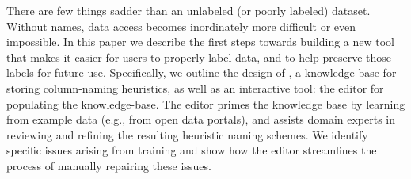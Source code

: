There are few things sadder than an unlabeled (or poorly labeled) dataset.
Without names, data access becomes inordinately more difficult or even impossible.
In this paper we describe the first steps towards building a new tool that makes it easier for users to properly label data, and to help preserve those labels for future use.
Specifically, we outline the design of \systemname, a knowledge-base for storing column-naming heuristics, as well as an interactive tool: the \systemname editor for populating the knowledge-base.  
The \systemname editor primes the knowledge base by learning from example data (e.g., from open data portals), and assists domain experts in reviewing and refining the resulting heuristic naming schemes.
We identify specific issues arising from training and show how the \systemname editor streamlines the process of manually repairing these issues.

